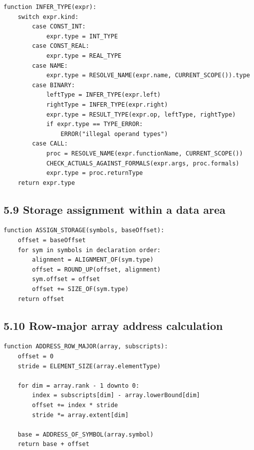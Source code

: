 \documentclass[10pt,letterpaper]{article}
\begin{document}
\begin{verbatim}
function INFER_TYPE(expr):
    switch expr.kind:
        case CONST_INT:
            expr.type = INT_TYPE
        case CONST_REAL:
            expr.type = REAL_TYPE
        case NAME:
            expr.type = RESOLVE_NAME(expr.name, CURRENT_SCOPE()).type
        case BINARY:
            leftType = INFER_TYPE(expr.left)
            rightType = INFER_TYPE(expr.right)
            expr.type = RESULT_TYPE(expr.op, leftType, rightType)
            if expr.type == TYPE_ERROR:
                ERROR("illegal operand types")
        case CALL:
            proc = RESOLVE_NAME(expr.functionName, CURRENT_SCOPE())
            CHECK_ACTUALS_AGAINST_FORMALS(expr.args, proc.formals)
            expr.type = proc.returnType
    return expr.type
\end{verbatim}

\subsection*{5.9 Storage assignment within a data area}

\begin{verbatim}
function ASSIGN_STORAGE(symbols, baseOffset):
    offset = baseOffset
    for sym in symbols in declaration order:
        alignment = ALIGNMENT_OF(sym.type)
        offset = ROUND_UP(offset, alignment)
        sym.offset = offset
        offset += SIZE_OF(sym.type)
    return offset
\end{verbatim}

\subsection*{5.10 Row-major array address calculation}

\begin{verbatim}
function ADDRESS_ROW_MAJOR(array, subscripts):
    offset = 0
    stride = ELEMENT_SIZE(array.elementType)

    for dim = array.rank - 1 downto 0:
        index = subscripts[dim] - array.lowerBound[dim]
        offset += index * stride
        stride *= array.extent[dim]

    base = ADDRESS_OF_SYMBOL(array.symbol)
    return base + offset
\end{verbatim}
\end{document}
